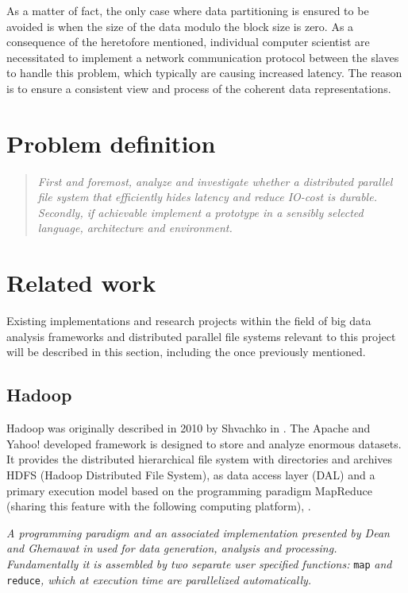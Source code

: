As a matter of fact, the only case where data partitioning is ensured to be avoided is when the size of the data modulo the block size is zero. As a consequence of the heretofore mentioned, individual computer scientist are necessitated to implement a network communication protocol between the slaves to handle this problem, which typically are causing increased latency. The reason is to ensure a consistent view and process of the coherent data representations.

\section{Problem definition} \label{sec:problem}
\begin{quotation}
\hspace*{-7mm}
\textit{First and foremost, analyze and investigate whether a distributed parallel file system that efficiently hides latency and reduce IO-cost is durable. Secondly, if achievable implement a prototype in a sensibly selected language, architecture and environment.} \newline
\end{quotation}

\section{Related work} \label{sec:related}
Existing implementations and research projects within the field of big data analysis frameworks and distributed parallel file systems relevant to this project will be described in this section, including the once previously mentioned.

\subsection*{Hadoop}
Hadoop was originally described in 2010 by Shvachko \etal in \cite{Shvachko:2010:HDF:1913798.1914427}. The Apache and Yahoo! developed framework is designed to store and analyze enormous datasets. It provides the distributed hierarchical file system with directories and archives HDFS (Hadoop Distributed File System), as data access layer (DAL) and a primary execution model based on the programming paradigm MapReduce (sharing this feature with the following computing platform), .
\vspace*{5mm}

\begin{definition}[MapReduce] \label{def:mapreduce}
\textit{A programming paradigm and an associated implementation presented by Dean and Ghemawat in} \cite{Dean:2008:MSD:1327452.1327492} \textit{used for data generation, analysis and processing. Fundamentally it is assembled by two separate user specified functions:} \texttt{map} \textit{and} \texttt{reduce}\textit{, which at execution time are parallelized automatically.}
\end{definition}

